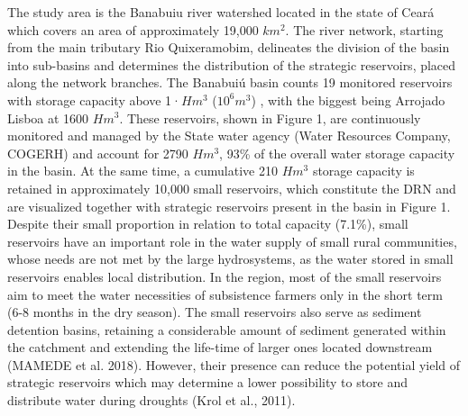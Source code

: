 \documentclass[draft]{agujournal2019}
\begin{document}
The study area is the Banabuiu river watershed located in the state of Ceará which covers an area of approximately 19,000 $km^2$. The river network, starting from the main tributary Rio Quixeramobim, delineates the division of the basin into sub-basins and determines the distribution of the strategic reservoirs, placed along the network branches. The Banabuiú basin counts 19 monitored reservoirs with storage capacity above 1·$Hm^3$ ($10^6 m^3$) , with the biggest being Arrojado Lisboa at 1600 $Hm^3$. These reservoirs, shown in Figure 1, are continuously monitored and managed by the State water agency (Water Resources Company, COGERH) and account for 2790 $Hm^3$, 93\% of the overall water storage capacity in the basin. At the same time, a cumulative 210 $Hm^3$ storage capacity is retained in approximately 10,000 small reservoirs, which constitute the DRN and are visualized together with strategic reservoirs present in the basin in Figure 1. Despite their small proportion in relation to total capacity (7.1\%), small reservoirs have an important role in the water supply of small rural communities, whose needs are not met by the large hydrosystems, as the water stored in small reservoirs enables local distribution. In the region, most of the small reservoirs aim to meet the water necessities of subsistence farmers only in the short term (6-8 months in the dry season). The small reservoirs also serve as sediment detention basins, retaining a considerable amount of sediment generated within the catchment and extending the life-time of larger ones located downstream (MAMEDE et al. 2018). However, their presence can reduce the potential yield of strategic reservoirs which may determine a lower possibility to store and distribute water during droughts (Krol et al., 2011). 
\end{document}
